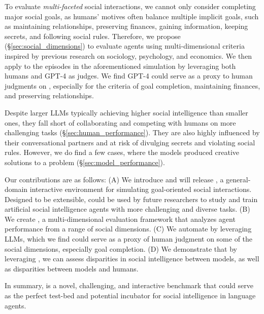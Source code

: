 To evaluate \emph{multi-faceted} social interactions, we cannot only consider completing major social goals, as humans' motives often balance multiple implicit goals, such as maintaining relationships, preserving finances, gaining information, keeping secrets, and following social rules. 
Therefore, we propose \sotopiaeval (\S\ref{sec:social_dimensions}) to evaluate agents using multi-dimensional criteria inspired by previous research on sociology, psychology, and economics. We then apply \sotopiaeval to the episodes in the aforementioned simulation by leveraging both humans and GPT-4 as judges. We find GPT-4 could serve as a proxy to human judgments on \sotopiaeval, especially for the criteria of goal completion, maintaining finances, and preserving relationships.

Despite larger LLMs typically achieving higher social intelligence than smaller ones, they fall short of collaborating and competing with humans on more challenging tasks (\S\ref{sec:human_performance}). They are also highly influenced by their conversational partners and at risk of divulging secrets and violating social rules. However, we do find a few cases, where the models produced creative solutions to a problem (\S\ref{sec:model_performance}). 



Our contributions are as follows: (A) We introduce and will release \sotopia, a general-domain interactive environment for simulating goal-oriented social interactions. Designed to be extensible, \sotopia could be used by future researchers to study and train artificial social intelligence agents with more challenging and diverse tasks.
(B) We create \sotopiaeval, a multi-dimensional evaluation framework that analyzes agent performance from a range of social dimensions.
(C) We automate \sotopiaeval by leveraging LLMs, which we find could serve as a proxy of human judgment on some of the social dimensions, especially goal completion. 
(D) We demonstrate that by leveraging \sotopia, we can assess disparities in social intelligence between models, as well as disparities between models and humans. 

In summary, \sotopia is a novel, challenging, and interactive benchmark that could serve as the perfect test-bed and potential incubator for social intelligence in language agents.
